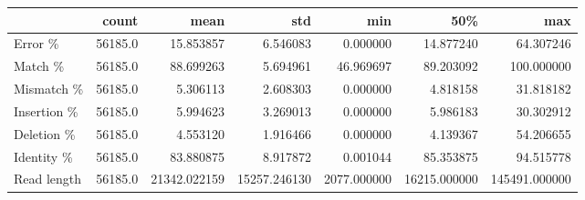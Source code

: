 \begin{tabular}{lrrrrrr}
\toprule
{} &    count &          mean &           std &          min &           50\% &            max \\
\midrule
Error \%     &  56185.0 &     15.853857 &      6.546083 &     0.000000 &     14.877240 &      64.307246 \\
Match \%     &  56185.0 &     88.699263 &      5.694961 &    46.969697 &     89.203092 &     100.000000 \\
Mismatch \%  &  56185.0 &      5.306113 &      2.608303 &     0.000000 &      4.818158 &      31.818182 \\
Insertion \% &  56185.0 &      5.994623 &      3.269013 &     0.000000 &      5.986183 &      30.302912 \\
Deletion \%  &  56185.0 &      4.553120 &      1.916466 &     0.000000 &      4.139367 &      54.206655 \\
Identity \%  &  56185.0 &     83.880875 &      8.917872 &     0.001044 &     85.353875 &      94.515778 \\
Read length &  56185.0 &  21342.022159 &  15257.246130 &  2077.000000 &  16215.000000 &  145491.000000 \\
\bottomrule
\end{tabular}
